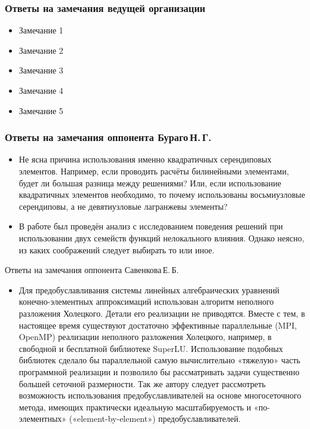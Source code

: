 \begin{frame}
    \frametitle{Ответы на замечания ведущей организации}
    \begin{itemize}
        \item Замечание 1
        \item Замечание 2
        \item Замечание 3
        \item Замечание 4
        \item Замечание 5
    \end{itemize}
\end{frame}

\begin{frame}
    \frametitle{Ответы на замечания оппонента Бураго\,Н.\,Г.}
    \begin{itemize}
    	\justifying
        \item Не ясна причина использования именно квадратичных серендиповых элементов. Например, если проводить расчёты билинейными элементами, будет ли большая разница между решениями? Или, если использование квадратичных элементов необходимо, то почему использованы восьмиузловые серендиповы, а не девятиузловые лагранжевы элементы?
        \item В работе был проведён анализ с исследованием поведения решений при использовании двух семейств функций нелокального влияния. Однако неясно, из каких соображений следует выбирать то или иное.
    \end{itemize}
\end{frame}

\begin{frame}{Ответы на замечания оппонента Савенкова\,Е.\,Б.}
    \begin{itemize}
    \justifying
        \item Для предобуславливания системы линейных алгебраических уравнений конечно-элементных аппроксимаций использован алгоритм неполного разложения Холецкого. Детали его реализации не приводятся. Вместе с тем, в настоящее время существуют достаточно эффективные параллельные (MPI, OpenMP) реализации неполного разложения Холецкого, например, в свободной и бесплатной библиотеке SuperLU. Использование подобных библиотек сделало бы параллельной самую вычислительно «тяжелую» часть программной реализации и позволило бы рассматривать задачи существенно большей сеточной размерности. Так же автору следует рассмотреть возможность использования предобуславливателей на основе многосеточного метода, имеющих практически идеальную масштабируемость и «по-элементных» («element-by-element») предобуславливателей.
    \end{itemize}
\end{frame}


